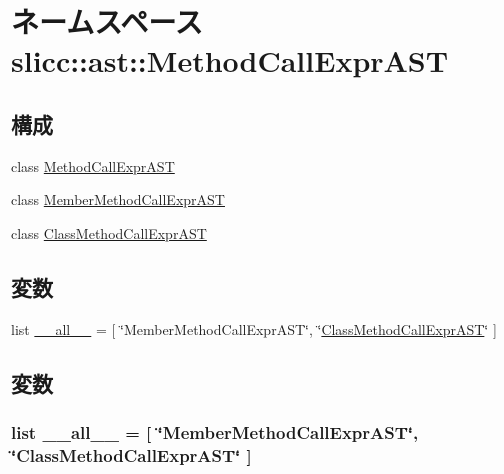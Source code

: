 \hypertarget{namespaceslicc_1_1ast_1_1MethodCallExprAST}{
\section{ネームスペース slicc::ast::MethodCallExprAST}
\label{namespaceslicc_1_1ast_1_1MethodCallExprAST}
}
\subsection*{構成}
\begin{DoxyCompactItemize}
\item 
class \hyperlink{classslicc_1_1ast_1_1MethodCallExprAST_1_1MethodCallExprAST}{MethodCallExprAST}
\item 
class \hyperlink{classslicc_1_1ast_1_1MethodCallExprAST_1_1MemberMethodCallExprAST}{MemberMethodCallExprAST}
\item 
class \hyperlink{classslicc_1_1ast_1_1MethodCallExprAST_1_1ClassMethodCallExprAST}{ClassMethodCallExprAST}
\end{DoxyCompactItemize}
\subsection*{変数}
\begin{DoxyCompactItemize}
\item 
list \hyperlink{namespaceslicc_1_1ast_1_1MethodCallExprAST_aa4a022e6ddacd362b83964da5cc5d044}{\_\-\_\-all\_\-\_\-} = \mbox{[} \char`\"{}MemberMethodCallExprAST\char`\"{}, \char`\"{}\hyperlink{classslicc_1_1ast_1_1MethodCallExprAST_1_1ClassMethodCallExprAST}{ClassMethodCallExprAST}\char`\"{} \mbox{]}
\end{DoxyCompactItemize}


\subsection{変数}
\hypertarget{namespaceslicc_1_1ast_1_1MethodCallExprAST_aa4a022e6ddacd362b83964da5cc5d044}{
\subsubsection[{\_\-\_\-all\_\-\_\-}]{\setlength{\rightskip}{0pt plus 5cm}list {\bf \_\-\_\-all\_\-\_\-} = \mbox{[} \char`\"{}MemberMethodCallExprAST\char`\"{}, \char`\"{}{\bf ClassMethodCallExprAST}\char`\"{} \mbox{]}}}
\label{namespaceslicc_1_1ast_1_1MethodCallExprAST_aa4a022e6ddacd362b83964da5cc5d044}
